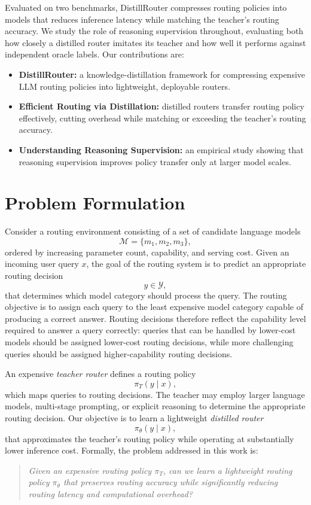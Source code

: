 \documentclass{article}
\begin{document}
Evaluated on two benchmarks, DistillRouter compresses routing policies into models that reduces inference latency while matching the teacher's routing accuracy. We study the role of reasoning supervision throughout, evaluating both how closely a distilled router imitates its teacher and how well it performs against independent oracle labels. Our contributions are:
\begin{itemize}
\item \textbf{DistillRouter:} a knowledge-distillation framework for compressing expensive LLM routing policies into lightweight, deployable routers.
\item \textbf{Efficient Routing via Distillation:} distilled routers transfer routing policy effectively, cutting overhead while matching or exceeding the teacher's routing accuracy.
\item \textbf{Understanding Reasoning Supervision:} an empirical study showing that reasoning supervision improves policy transfer only at larger model scales.
\end{itemize}
\section{Problem Formulation}
\label{sec:problem_formulation}

Consider a routing environment consisting of a set of candidate language models
\[
\mathcal{M} = \{m_1, m_2, m_3\},
\]
ordered by increasing parameter count, capability, and serving cost. Given an incoming user query $x$, the goal of the routing system is to predict an appropriate routing decision
\[
y \in \mathcal{Y},
\]
that determines which model category should process the query. The routing objective is to assign each query to the least expensive model category capable of producing a correct answer. Routing decisions therefore reflect the capability level required to answer a query correctly: queries that can be handled by lower-cost models should be assigned lower-cost routing decisions, while more challenging queries should be assigned higher-capability routing decisions.

An expensive \emph{teacher router} defines a routing policy
\[
\pi_T(y \mid x),
\]
which maps queries to routing decisions. The teacher may employ larger language models, multi-stage prompting, or explicit reasoning to determine the appropriate routing decision. Our objective is to learn a lightweight \emph{distilled router}
\[
\pi_\theta(y \mid x),
\]
that approximates the teacher's routing policy while operating at substantially lower inference cost. Formally, the problem addressed in this work is:
\begin{quote}
\emph{Given an expensive routing policy $\pi_T$, can we learn a lightweight routing policy $\pi_\theta$ that preserves routing accuracy while significantly reducing routing latency and computational overhead?}
\end{quote}
\end{document}
